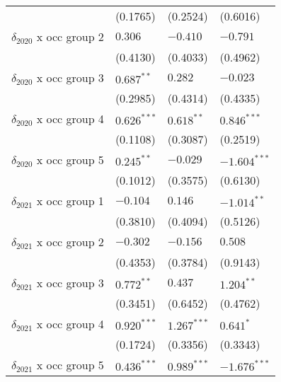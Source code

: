 \begin{tabular}{llll}
                                       &           (0.1765) &           (0.2524) &           (0.6016) \\
$\delta_{2020}$ x occ group 2          &            $0.306$ &           $-0.410$ &           $-0.791$ \\
                                       &           (0.4130) &           (0.4033) &           (0.4962) \\
$\delta_{2020}$ x occ group 3          &       $0.687^{**}$ &            $0.282$ &           $-0.023$ \\
                                       &           (0.2985) &           (0.4314) &           (0.4335) \\
$\delta_{2020}$ x occ group 4          &      $0.626^{***}$ &       $0.618^{**}$ &      $0.846^{***}$ \\
                                       &           (0.1108) &           (0.3087) &           (0.2519) \\
$\delta_{2020}$ x occ group 5          &       $0.245^{**}$ &           $-0.029$ &     $-1.604^{***}$ \\
                                       &           (0.1012) &           (0.3575) &           (0.6130) \\
$\delta_{2021}$ x occ group 1          &           $-0.104$ &            $0.146$ &      $-1.014^{**}$ \\
                                       &           (0.3810) &           (0.4094) &           (0.5126) \\
$\delta_{2021}$ x occ group 2          &           $-0.302$ &           $-0.156$ &            $0.508$ \\
                                       &           (0.4353) &           (0.3784) &           (0.9143) \\
$\delta_{2021}$ x occ group 3          &       $0.772^{**}$ &            $0.437$ &       $1.204^{**}$ \\
                                       &           (0.3451) &           (0.6452) &           (0.4762) \\
$\delta_{2021}$ x occ group 4          &      $0.920^{***}$ &      $1.267^{***}$ &          $0.641^*$ \\
                                       &           (0.1724) &           (0.3356) &           (0.3343) \\
$\delta_{2021}$ x occ group 5          &      $0.436^{***}$ &      $0.989^{***}$ &     $-1.676^{***}$ \\

\end{tabular}
